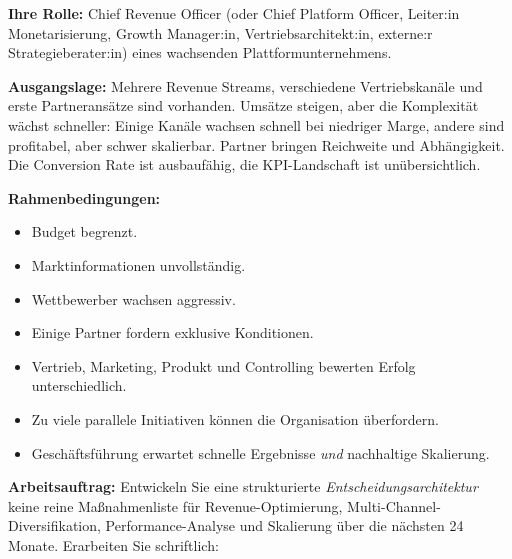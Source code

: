 \documentclass[11pt,a4paper,oneside]{article}
\begin{document}
\begin{infobox}
\textbf{Ihre Rolle:} Chief Revenue Officer (oder Chief Platform Officer, Leiter:in Monetarisierung, Growth Manager:in, Vertriebsarchitekt:in, externe:r Strategieberater:in) eines wachsenden Plattformunternehmens.

\smallskip
\textbf{Ausgangslage:} Mehrere Revenue Streams, verschiedene Vertriebskanäle und erste Partneransätze sind vorhanden. Umsätze steigen, aber die Komplexität wächst schneller: Einige Kanäle wachsen schnell bei niedriger Marge, andere sind profitabel, aber schwer skalierbar. Partner bringen Reichweite und Abhängigkeit. Die Conversion Rate ist ausbaufähig, die KPI-Landschaft ist unübersichtlich.

\smallskip
\textbf{Rahmenbedingungen:}
\begin{itemize}
  \item Budget begrenzt.
  \item Marktinformationen unvollständig.
  \item Wettbewerber wachsen aggressiv.
  \item Einige Partner fordern exklusive Konditionen.
  \item Vertrieb, Marketing, Produkt und Controlling bewerten Erfolg unterschiedlich.
  \item Zu viele parallele Initiativen können die Organisation überfordern.
  \item Geschäftsführung erwartet schnelle Ergebnisse \emph{und} nachhaltige Skalierung.
\end{itemize}
\end{infobox}

\noindent\textbf{Arbeitsauftrag:} Entwickeln Sie eine strukturierte \emph{Entscheidungsarchitektur} \textendash{} keine reine Maßnahmenliste \textendash{} für Revenue-Optimierung, Multi-Channel-Diversifikation, Performance-Analyse und Skalierung über die nächsten 24 Monate. Erarbeiten Sie schriftlich:
\end{document}
